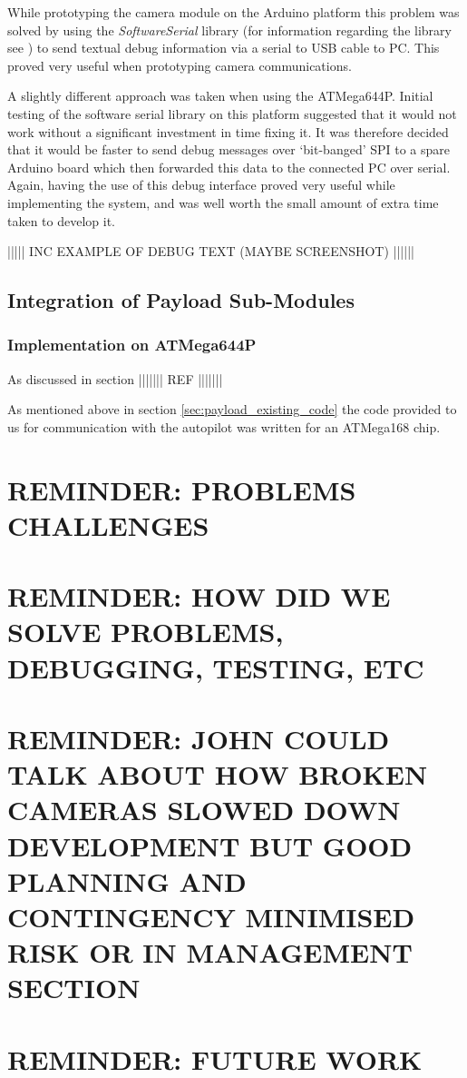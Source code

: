 While prototyping the camera module on the Arduino platform this problem was 
solved by using the \emph{SoftwareSerial} library (for information regarding 
the library see \cite{software_serial}) to send textual debug information via
a serial to USB cable to PC. This proved very useful when prototyping camera
communications.

A slightly different approach was taken when using the ATMega644P. Initial 
testing of the software serial library on this platform suggested that it 
would not work without a significant investment in time fixing it. It was
therefore decided that it would be faster to send debug messages over 
`bit-banged' SPI to a spare Arduino board which then forwarded this data to 
the connected PC over serial. Again, having the use of this debug interface 
proved very useful while implementing the system, and was well worth the 
small amount of extra time taken to develop it.

||||| INC EXAMPLE OF DEBUG TEXT (MAYBE SCREENSHOT) ||||||

\subsection{Integration of Payload Sub-Modules}

\subsubsection{Implementation on ATMega644P}
As discussed in section ||||||| REF |||||||

As mentioned above in section \ref{sec:payload_existing_code} the code provided
to us for communication with the autopilot was written for an ATMega168 chip. 



\section{REMINDER: PROBLEMS CHALLENGES}
\section{REMINDER: HOW DID WE SOLVE PROBLEMS, DEBUGGING, TESTING, ETC}
\section{REMINDER: JOHN COULD TALK ABOUT HOW BROKEN CAMERAS SLOWED DOWN DEVELOPMENT BUT GOOD PLANNING AND CONTINGENCY MINIMISED RISK OR IN MANAGEMENT SECTION}
\section{REMINDER: FUTURE WORK}

